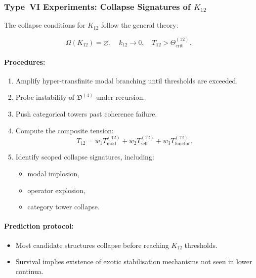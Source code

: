 \subsubsection{Type~VI Experiments: Collapse Signatures of $K_{12}$}

The collapse conditions for $K_{12}$ follow the general theory:

\[
  \Omega(K_{12}) = \varnothing,
  \quad
  k_{12} \rightarrow 0,
  \quad
  T_{12} > \Theta_{\mathrm{crit}}^{(12)}.
\]

\paragraph{Procedures:}

\begin{enumerate}
    \item Amplify hyper-transfinite modal branching until 
          thresholds are exceeded.
    \item Probe instability of $\mathfrak{D}^{(4)}$ under recursion.
    \item Push categorical towers past coherence failure.
    \item Compute the composite tension:
          \[
            T_{12} = w_1 T_{\mathrm{mod}}^{(12)} 
                     + w_2 T_{\mathrm{self}}^{(12)} 
                     + w_3 T_{\mathrm{functor}}^{(12)}.
          \]
    \item Identify scoped collapse signatures, including:
          \begin{itemize}
              \item modal implosion,
              \item operator explosion,
              \item category tower collapse.
          \end{itemize}
\end{enumerate}

\paragraph{Prediction protocol:}

\begin{itemize}
    \item Most candidate structures collapse before reaching 
          $K_{12}$ thresholds.
    \item Survival implies existence of exotic stabilisation 
          mechanisms not seen in lower continua.
\end{itemize}



